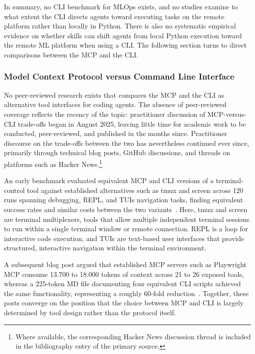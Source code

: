 \documentclass[
english,                 %
bibtex,                  %
includeExtraAbstracts, %
]{kththesis}
\numberwithin{listing}{chapter}
\begin{document}
In summary, no \gls{CLI} benchmark for \gls{MLOps} exists, and no studies examine to what extent the \gls{CLI} directs agents toward executing tasks on the remote platform rather than locally in Python. There is also no systematic empirical evidence on whether skills can shift agents from local Python execution toward the remote \gls{ML} platform when using a \gls{CLI}. The following section turns to direct comparisons between the \gls{MCP} and the \gls{CLI}.

\subsubsection{Model Context Protocol versus Command Line Interface}

No peer-reviewed research exists that compares the \gls{MCP} and the \gls{CLI} as alternative tool interfaces for coding agents. The absence of peer-reviewed coverage reflects the recency of the topic: practitioner discussion of \gls{MCP}-versus-\gls{CLI} trade-offs began in August 2025, leaving little time for academic work to be conducted, peer-reviewed, and published in the months since. Practitioner discourse on the trade-offs between the two has nevertheless continued ever since, primarily through technical blog posts, GitHub discussions, and threads on platforms such as Hacker News.\footnote{Where available, the corresponding Hacker News discussion thread is included in the bibliography entry of the primary source.}

An early benchmark evaluated equivalent \gls{MCP} and \gls{CLI} versions of a terminal-control tool against established alternatives such as tmux and screen across 120 runs spanning debugging, \gls{REPL}, and \glspl{TUI} navigation tasks, finding equivalent success rates and similar costs between the two variants~\cite{zechner_mcp_2025}. Here, tmux and screen are terminal multiplexers, tools that allow multiple independent terminal sessions to run within a single terminal window or remote connection. \gls{REPL} is a loop for interactive code execution, and \glspl{TUI} are text-based user interfaces that provide structured, interactive navigation within the terminal environment. 

A subsequent blog post argued that established \gls{MCP} servers such as Playwright \gls{MCP} consume 13.700 to 18.000 tokens of context across 21 to 26 exposed tools, whereas a 225-token \gls{MD} file documenting four equivalent \gls{CLI} scripts achieved the same functionality, representing a roughly 60-fold reduction~\cite{zechner_what_2025}. Together, these posts converge on the position that the choice between \gls{MCP} and \gls{CLI} is largely determined by tool design rather than the protocol itself.
\end{document}
